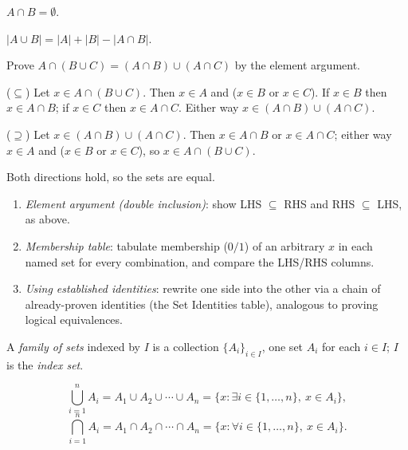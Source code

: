 \begin{definition}[Disjoint]
$A \cap B = \emptyset$.
\end{definition}

\begin{theorem}
$|A \cup B| = |A| + |B| - |A \cap B|$.
\end{theorem}

\begin{example}
Prove $A \cap (B \cup C) = (A \cap B) \cup (A \cap C)$ by the element argument.

($\subseteq$) Let $x \in A \cap (B\cup C)$. Then $x \in A$ and ($x \in B$ or $x \in C$). If $x \in B$ then $x \in A\cap B$; if $x \in C$ then $x \in A\cap C$. Either way $x \in (A\cap B)\cup(A\cap C)$.

($\supseteq$) Let $x \in (A\cap B)\cup(A\cap C)$. Then $x \in A\cap B$ or $x \in A\cap C$; either way $x \in A$ and ($x \in B$ or $x \in C$), so $x \in A \cap (B\cup C)$.

Both directions hold, so the sets are equal.
\end{example}

\begin{note}
\begin{enumerate}[label=(\roman*)]
    \item \emph{Element argument (double inclusion)}: show LHS $\subseteq$ RHS and RHS $\subseteq$ LHS, as above.
    \item \emph{Membership table}: tabulate membership ($0/1$) of an arbitrary $x$ in each named set for every combination, and compare the LHS/RHS columns.
    \item \emph{Using established identities}: rewrite one side into the other via a chain of already-proven identities (the Set Identities table), analogous to proving logical equivalences.
\end{enumerate}
\end{note}

\begin{definition}
A \emph{family of sets} indexed by $I$ is a collection $\{A_i\}_{i \in I}$, one set $A_i$ for each $i \in I$; $I$ is the \emph{index set}.
\end{definition}

\begin{definition}
\[
\bigcup_{i=1}^n A_i = A_1 \cup A_2 \cup \cdots \cup A_n = \{x : \exists i \in \{1,\dots,n\},\ x\in A_i\},
\]
\[
\bigcap_{i=1}^n A_i = A_1 \cap A_2 \cap \cdots \cap A_n = \{x : \forall i \in \{1,\dots,n\},\ x\in A_i\}.
\]
\end{definition}

